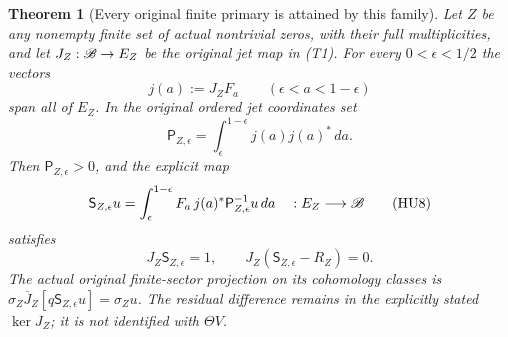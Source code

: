 \documentclass[11pt]{article}
\newtheorem{theorem}{Theorem}[section]
\begin{document}
\begin{theorem}[Every original finite primary is attained by this family]
Let $Z$ be any nonempty finite set of actual nontrivial zeros,
with their full multiplicities, and let $J_Z:\mathscr B\to E_Z$ be the
original jet map in (T1). For every $0<\epsilon<1/2$ the
vectors
\[
 j(a):=J_ZF_a\qquad(\epsilon<a<1-\epsilon)
\]
span all of $E_Z$. In the original ordered jet coordinates set
\[
 \mathsf P_{Z,\epsilon}
    =\int_\epsilon^{1-\epsilon} j(a)j(a)^*\,da.
 \tag{HU7}
\]
Then $\mathsf P_{Z,\epsilon}>0$, and the explicit map
\[
 \mathsf S_{Z,\epsilon}u
   =\int_\epsilon^{1-\epsilon}
      F_a\,j(a)^*\mathsf P_{Z,\epsilon}^{-1}u\,da
       \quad:E_Z\longrightarrow\mathscr B
 \tag{HU8}
\]
satisfies
\[
 J_Z\mathsf S_{Z,\epsilon}=1,\qquad
 J_Z(\mathsf S_{Z,\epsilon}-R_Z)=0.
 \tag{HU9}
\]
The actual original finite-sector projection on its cohomology
classes is
$\sigma_Z\overline J_Z[q\mathsf S_{Z,\epsilon}u]=\sigma_Zu$.
The residual difference remains in the explicitly stated
$\ker J_Z$; it is not identified with $\Theta V$.
\end{theorem}
\end{document}
